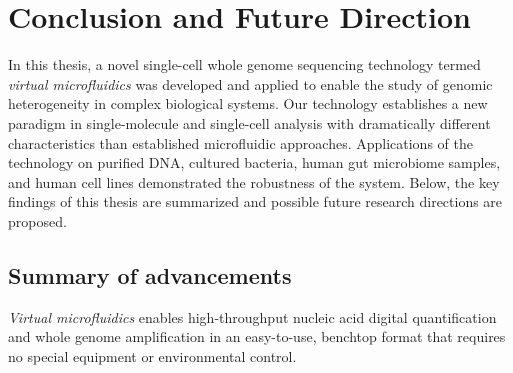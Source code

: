 \chapter{Conclusion and Future Direction}
In this thesis, a novel single-cell whole genome sequencing technology termed \textit{virtual microfluidics} was developed and applied to enable the study of genomic heterogeneity in complex biological systems. Our technology establishes a new paradigm in single-molecule and single-cell analysis with dramatically different characteristics than established microfluidic approaches. Applications of the technology on purified DNA, cultured bacteria, human gut microbiome samples, and human cell lines demonstrated the robustness of the system. Below, the key findings of this thesis are summarized and possible future research directions are proposed.

\section{Summary of advancements}
\textit{Virtual microfluidics} enables high-throughput nucleic acid digital quantification and whole genome amplification in an easy-to-use, benchtop format that requires no special equipment or environmental control. 


